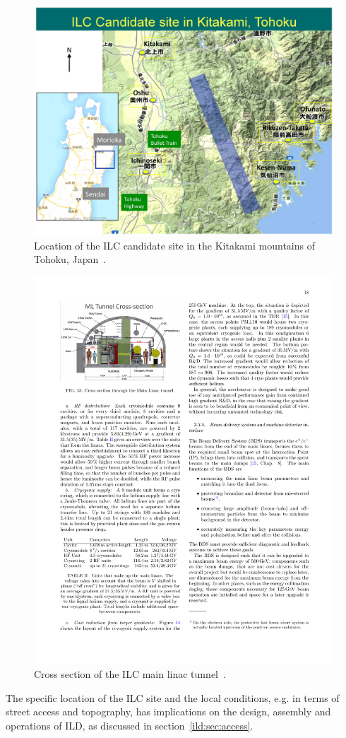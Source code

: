 \begin{figure}[htbp]
\centering
\includegraphics[width=0.9\hsize]{ILC/figs/ILC-Candidate-Area.jpg}
\caption{\label{ild:fig:ilc_site}Location of the ILC candidate site in the Kitakami mountains of Tohoku, Japan~\cite{ild:bib:Newsline_Kitakami}.}
\end{figure}
\begin{figure}[htbp]
\centering
\includegraphics[width=0.8\hsize]{ILC/figs/ilc_tunnel.pdf}
\caption{\label{ild:fig:ilc_tunnel}Cross section of the ILC main linac tunnel~\cite{Bambade:2019fyw}.}
\end{figure}
The specific location of the ILC site and the local conditions, e.g. in terms of street access and topography, has implications on the design, assembly and operations of ILD, as discussed in section~\ref{ild:sec:access}.

